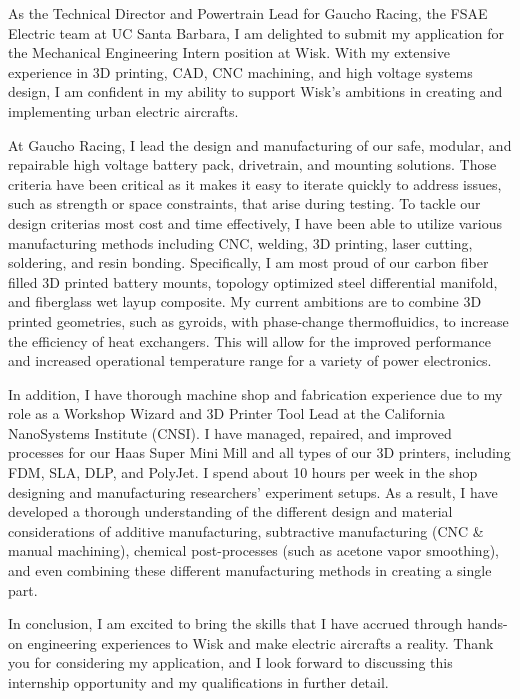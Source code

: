 \documentclass[11pt, letterpaper]{awesome-cv} %
\begin{document}
\makecvheader %

\makelettertitle %


\begin{cvletter}


As the Technical Director and Powertrain Lead for Gaucho Racing, the FSAE Electric team at UC Santa Barbara, I am delighted to submit my application for the Mechanical Engineering Intern position at Wisk. With my extensive experience in 3D printing, CAD, CNC machining, and high voltage systems design, I am confident in my ability to support Wisk's ambitions in creating and implementing urban electric aircrafts.

At Gaucho Racing, I lead the design and manufacturing of our safe, modular, and repairable high voltage battery pack, drivetrain, and mounting solutions. Those criteria have been critical as it makes it easy to iterate quickly to address issues, such as strength or space constraints, that arise during testing. To tackle our design criterias most cost and time effectively, I have been able to utilize various manufacturing methods including CNC, welding, 3D printing, laser cutting, soldering, and resin bonding. Specifically, I am most proud of our carbon fiber filled 3D printed battery mounts, topology optimized steel differential manifold, and fiberglass wet layup composite. My current ambitions are to combine 3D printed geometries, such as gyroids, with phase-change thermofluidics, to increase the efficiency of heat exchangers. This will allow for the improved performance and increased operational temperature range for a variety of power electronics.

In addition, I have thorough machine shop and fabrication experience due to my role as a Workshop Wizard and 3D Printer Tool Lead at the California NanoSystems Institute (CNSI). I have managed, repaired, and improved processes for our Haas Super Mini Mill and all types of our 3D printers, including FDM, SLA, DLP, and PolyJet. I spend about 10 hours per week in the shop designing and manufacturing researchers' experiment setups. As a result, I have developed a thorough understanding of the different design and material considerations of additive manufacturing, subtractive manufacturing (CNC \& manual machining), chemical post-processes (such as acetone vapor smoothing), and even combining these different manufacturing methods in creating a single part.

In conclusion, I am excited to bring the skills that I have accrued through hands-on engineering experiences to Wisk and make electric aircrafts a reality. Thank you for considering my application, and I look forward to discussing this internship opportunity and my qualifications in further detail.


\end{cvletter}


\makeletterclosing %
\end{document}
